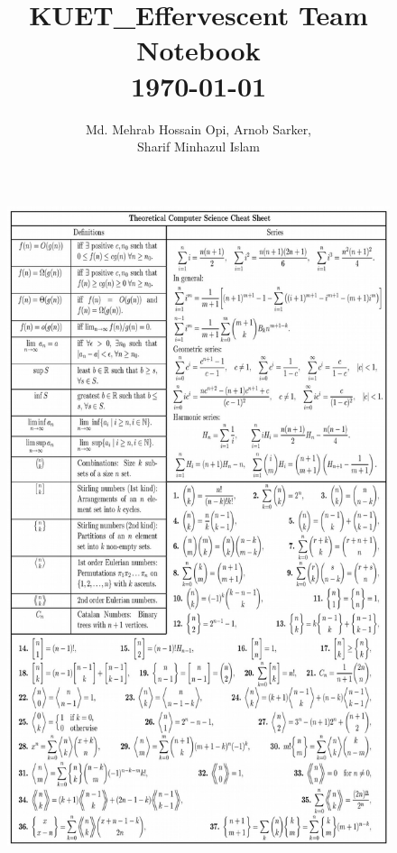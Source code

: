 \documentclass[8pt, a4paper, onesided]{article}
\title{\vspace{-2.5ex}\Large{KUET\_Effervescent Team Notebook\\\today}}
\author{Md. Mehrab Hossain Opi, Arnob Sarker,\\Sharif Minhazul Islam}
\date{}
\begin{document}
\begin{landscape}
\begin{multicols*}{3}

\maketitle
\vspace{-7ex}
\tableofcontents
\pagestyle{fancy}
 
\raggedbottom

\end{multicols*}

\begin{figure}[]
    \centering
    \includegraphics[width=\textheight/3, angle=90]{form0}\\

\end{figure}
\end{landscape}
\end{document}
